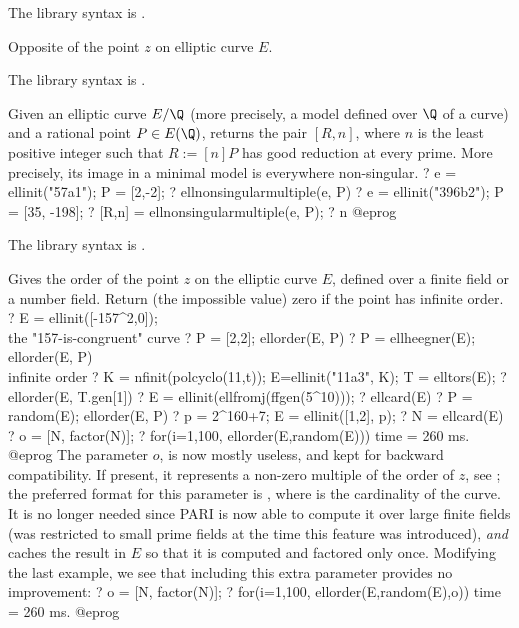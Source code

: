 The library syntax is .

\label{se:ellneg}
Opposite of the point $z$ on elliptic curve $E$.

The library syntax is .

\label{se:ellnonsingularmultiple}
Given an elliptic curve $E/\Q$ (more precisely, a model defined over $\Q$
of a curve) and a rational point $P \in E(\Q)$, returns the pair $[R,n]$,
where $n$ is the least positive integer such that $R := [n]P$ has good
reduction at every prime. More precisely, its image in a minimal model is
everywhere non-singular.
\bprog
? e = ellinit("57a1"); P = [2,-2];
? ellnonsingularmultiple(e, P)
? e = ellinit("396b2"); P = [35, -198];
? [R,n] = ellnonsingularmultiple(e, P);
? n
@eprog

The library syntax is .

\label{se:ellorder}
Gives the order of the point $z$ on the elliptic
curve $E$, defined over a finite field or a number field.
Return (the impossible value) zero if the point has infinite order.
\bprog
? E = ellinit([-157^2,0]);  \\ the "157-is-congruent" curve
? P = [2,2]; ellorder(E, P)
? P = ellheegner(E); ellorder(E, P) \\ infinite order
? K = nfinit(polcyclo(11,t)); E=ellinit("11a3", K); T = elltors(E);
? ellorder(E, T.gen[1])
? E = ellinit(ellfromj(ffgen(5^10)));
? ellcard(E)
? P = random(E); ellorder(E, P)
? p = 2^160+7; E = ellinit([1,2], p);
? N = ellcard(E)
? o = [N, factor(N)];
? for(i=1,100, ellorder(E,random(E)))
time = 260 ms.
@eprog
The parameter $o$, is now mostly useless, and kept for backward
compatibility. If present, it represents a non-zero multiple of the order
of $z$, see ; the preferred format for this parameter is
, where  is the cardinality of the curve.
It is no longer needed since PARI is now able to compute it over large
finite fields (was restricted to small prime fields at the time this feature
was introduced), \emph{and} caches the result in $E$ so that it is computed
and factored only once. Modifying the last example, we see that including
this extra parameter provides no improvement:
\bprog
? o = [N, factor(N)];
? for(i=1,100, ellorder(E,random(E),o))
time = 260 ms.
@eprog

